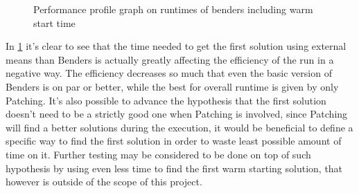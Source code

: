 \begin{figure}[htbp]
	\centering
	\caption{Performance profile graph on runtimes of benders including warm start time \label{fig:bendersFullPerfProf}}
\end{figure}

In \figurename{ \ref{fig:bendersFullPerfProf}} it's clear to see that the time needed to get the first solution using external means than Benders is actually greatly affecting the efficiency of the run in a negative way.
The efficiency decreases so much that even the basic version of Benders is on par or better, while the best for overall runtime is given by only Patching.
It's also possible to advance the hypothesis that the first solution doesn't need to be a strictly good one when Patching is involved, since Patching will find a better solutions during the execution, it would be beneficial to define a specific way to find the first solution in order to waste least possible amount of time on it.
Further testing may be considered to be done on top of such hypothesis by using even less time to find the first warm starting solution, that however is outside of the scope of this project.

